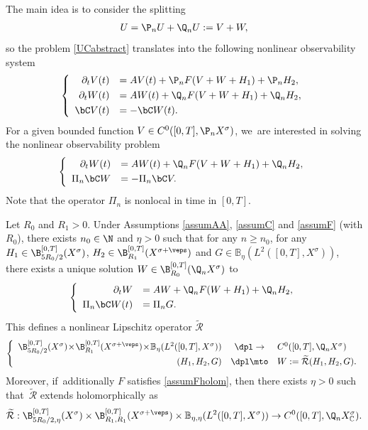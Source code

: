 The main idea is to consider the splitting
\begin{align*}
U=\P_n U+\Q_n U:=V+W,
\end{align*}
so the problem \eqref{UCabstract} translates into the following nonlinear observability system
\begin{align*}
\left\{\begin{array}{rl}
\partial_t V(t)&=AV(t)+\P_n F( V+W+H_{1})+\P_{n}H_{2}, \\[3pt]
\partial_t W(t)&=AW(t)+\Q_n F(V+W+H_{1})+\Q_{n}H_{2}, \\[3pt]
\bC V(t)&=-\bC W(t).
\end{array}\right.
\end{align*}
For a given bounded function $V\in C^0([0, T], \P_n X^\sigma)$, we~are interested in solving the nonlinear observability problem
\begin{align*}
\left\{\begin{array}{rl}
\partial_t W(t)&=AW(t)+\Q_n F(V+W+H_{1})+\Q_{n}H_{2}, \\[3pt]
\Pi_n\bC W &=- \Pi_n\bC V.
\end{array}\right.
\end{align*}
Note that the operator $\Pi_{n}$ is nonlocal in time in $[0,T]$.
\begin{proposition}\label{propabstract}
Let $R_{0}$ and $R_{1}>0$. Under Assumptions \ref{assumAA}, \ref{assumC} and \ref{assumF} (with $R_{0}$), there exists $n_{0}\in \N$ and $\eta>0$ such that for any $n\geq n_{0}$, for any $H_{1}\in \B_{5R_{0}/2}^{[0,T]}(X^{\sigma})$, $H_{2}\in \B_{R_{1}}^{[0,T]}(X^{\sigma+\veps})$ and $G\in \mathbb{B}_{\eta}(L^2([0, T], X^{\sigma}))$, there exists a unique solution $W\in \B_{R_{0}}^{[0,T]}(\Q_n X^{\sigma})$ to
\begin{align}\label{eqWG}
\left\{\begin{array}{rl}
\partial_t W&=AW+\Q_n F(W+H_{1})+\Q_{n}H_{2}, \\[3pt]
\Pi_n\bC W(t) &=\Pi_nG.
\end{array}\right.
\end{align}
This defines a nonlinear Lipschitz operator $\mathcal{\widetilde{R}}$
\begin{align}
\left\{\begin{array}{rcl}
\B_{5R_{0}/2}^{[0,T]}(X^{\sigma}) \!\times\! \B_{R_{1}}^{[0,T]}(X^{\sigma+\veps}) \!\times\! \mathbb{B}_{\eta}(L^{2}([0,T],X^{\sigma})) & \dpl\to& C^0([0, T], \Q_{n }X^{\sigma})\\[3pt]
(H_{1},H_{2},G)&\dpl\mto& W:=\mathcal{\widetilde{R}}(H_{1},H_{2},G).
\end{array}\right.
\end{align}
Moreover, if~additionally $F$ satisfies \cref{assumFholom}, then there exists $\eta>0$ such that~$\mathcal{\widetilde{R}}$ extends holomorphically as
\begin{align*}
\mathcal{\widetilde{R}}: \B_{5R_{0}/2,\eta}^{[0,T]}(X^{\sigma}) \times \B_{R_{1}, R_{1}}^{[0,T]}(X^{\sigma+\veps})\times \mathbb{B}_{\eta,\eta}(L^{2}([0,T],X^{\sigma})) \to C^0([0, T], \Q_{n }X^{\sigma}_{\mathbb{C}}).
\end{align*}
\end{proposition}
